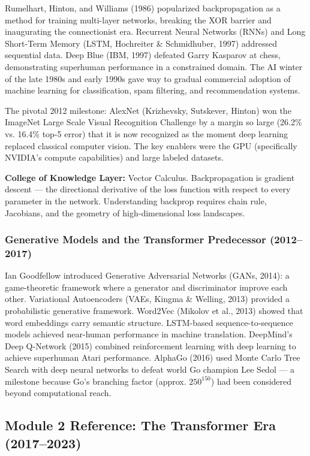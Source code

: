 \documentclass[11pt,letterpaper]{article}
\begin{document}
Rumelhart, Hinton, and Williams (1986) popularized backpropagation as a method for training multi-layer networks, breaking the XOR barrier and inaugurating the connectionist era. Recurrent Neural Networks (RNNs) and Long Short-Term Memory (LSTM, Hochreiter \& Schmidhuber, 1997) addressed sequential data. Deep Blue (IBM, 1997) defeated Garry Kasparov at chess, demonstrating superhuman performance in a constrained domain. The AI winter of the late 1980s and early 1990s gave way to gradual commercial adoption of machine learning for classification, spam filtering, and recommendation systems.

The pivotal 2012 milestone: AlexNet (Krizhevsky, Sutskever, Hinton) won the ImageNet Large Scale Visual Recognition Challenge by a margin so large (26.2\% vs. 16.4\% top-5 error) that it is now recognized as the moment deep learning replaced classical computer vision. The key enablers were the GPU (specifically NVIDIA's compute capabilities) and large labeled datasets.

\textbf{College of Knowledge Layer:} Vector Calculus. Backpropagation is gradient descent --- the directional derivative of the loss function with respect to every parameter in the network. Understanding backprop requires chain rule, Jacobians, and the geometry of high-dimensional loss landscapes.

\subsubsection{Generative Models and the Transformer Predecessor (2012--2017)}

Ian Goodfellow introduced Generative Adversarial Networks (GANs, 2014): a game-theoretic framework where a generator and discriminator improve each other. Variational Autoencoders (VAEs, Kingma \& Welling, 2013) provided a probabilistic generative framework. Word2Vec (Mikolov et al., 2013) showed that word embeddings carry semantic structure. LSTM-based sequence-to-sequence models achieved near-human performance in machine translation. DeepMind's Deep Q-Network (2015) combined reinforcement learning with deep learning to achieve superhuman Atari performance. AlphaGo (2016) used Monte Carlo Tree Search with deep neural networks to defeat world Go champion Lee Sedol --- a milestone because Go's branching factor (approx. $250^{150}$) had been considered beyond computational reach.

\subsection{Module 2 Reference: The Transformer Era (2017--2023)}
\end{document}
